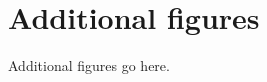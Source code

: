 \chapter{Additional figures}
\label{sec:appendix/additional_figures}

Additional figures go here.

% 
